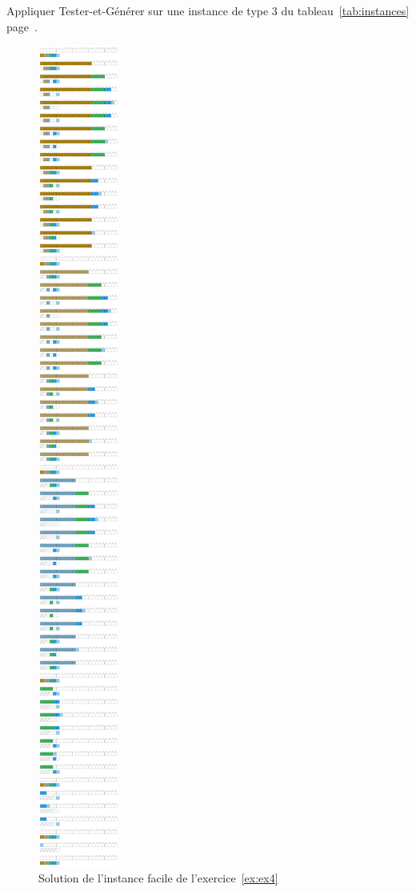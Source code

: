 \documentclass[11pt]{article}
\newcommand{\instance}[1]{instance de type #1 du tableau~\ref{tab:instances} page~\pageref{tab:instances}}
\begin{document}
  \begin{exercice}{}
    Appliquer Tester-et-Générer sur une \instance{3}.
  \end{exercice}

\begin{figure}[htbp]
    \centering
    \includegraphics[width=0.6\linewidth]{ex4-6-TG.pdf}
    \caption{Solution de l'instance facile de l'exercice~\ref{ex:ex4}}
  \end{figure}
\end{document}
